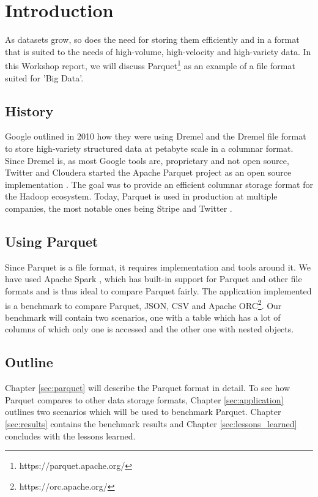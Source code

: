 \section{Introduction} \label{sec:introduction}

As datasets grow, so does the need for storing them efficiently and in a format that is suited to the needs of high-volume, high-velocity and high-variety data.
In this Workshop report, we will discuss Parquet\footnote{https://parquet.apache.org/} as an example of a file format suited for 'Big Data'.

\subsection{History}
Google outlined in 2010 how they were using Dremel \cite{dremel:melnik} and the Dremel file format to store high-variety structured data at petabyte scale in a columnar format.
Since Dremel is, as most Google tools are, proprietary and not open source,
Twitter and Cloudera started the Apache Parquet project as an open source implementation \cite{parquet-announcement:kestelyn}.
The goal was to provide an efficient columnar storage format for the Hadoop ecosystem.
Today, Parquet is used in production at multiple companies, the most notable ones being Stripe and Twitter \cite{adopters:parquet}.

\subsection{Using Parquet}
Since Parquet is a file format, it requires implementation and tools around it.
We have used Apache Spark \cite{spark:zaharia}, which has built-in support for Parquet and other file formats and is thus ideal to compare Parquet fairly.
The application implemented is a benchmark to compare Parquet, JSON, CSV and Apache ORC\footnote{https://orc.apache.org/}.
Our benchmark will contain two scenarios,
one with a table which has a lot of columns of which only one is accessed and the other one with nested objects.

\subsection{Outline}
Chapter \ref{sec:parquet} will describe the Parquet format in detail.
To see how Parquet compares to other data storage formats, Chapter \ref{sec:application} outlines two scenarios which will be used to benchmark Parquet.
Chapter \ref{sec:results} contains the benchmark results and Chapter \ref{sec:lessons_learned} concludes with the lessons learned.